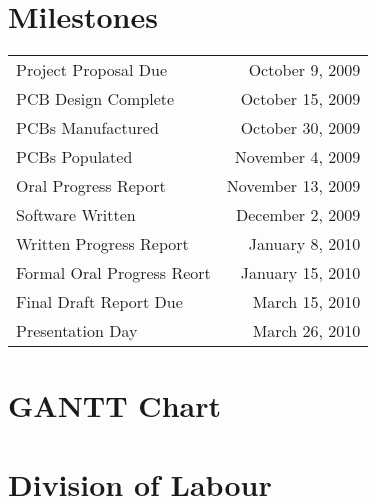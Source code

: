 \section{Milestones}

\begin{center}
  \begin{tabular}{|l|r|}
    \hline
    Project Proposal Due & October 9, 2009\\
    PCB Design Complete & October 15, 2009\\
    PCBs Manufactured & October 30, 2009\\
    PCBs Populated & November 4, 2009\\
    Oral Progress Report & November 13, 2009\\
    Software Written & December 2, 2009\\
    Written Progress Report & January 8, 2010\\
    Formal Oral Progress Reort & January 15, 2010\\
    Final Draft Report Due & March 15, 2010\\
    Presentation Day & March 26, 2010\\
    \hline
  \end{tabular}
\end{center}


\section{GANTT Chart}
\section{Division of Labour}
